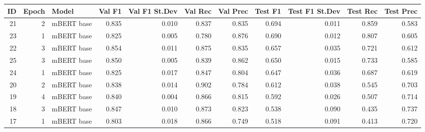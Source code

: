 \begin{tabular}{rrlrrrrrrrr}
\toprule
 ID &  Epoch &      Model &  Val F1 &  Val F1 St.Dev &  Val Rec &  Val Prec &  Test F1 &  Test F1 St.Dev &  Test Rec &  Test Prec \\
\midrule
 21 &      2 & mBERT base &   0.835 &          0.010 &    0.837 &     0.835 &    0.694 &           0.011 &     0.859 &      0.583 \\
 23 &      1 & mBERT base &   0.825 &          0.005 &    0.780 &     0.876 &    0.690 &           0.012 &     0.807 &      0.605 \\
 22 &      3 & mBERT base &   0.854 &          0.011 &    0.875 &     0.835 &    0.657 &           0.035 &     0.721 &      0.612 \\
 25 &      3 & mBERT base &   0.850 &          0.005 &    0.839 &     0.862 &    0.650 &           0.015 &     0.733 &      0.585 \\
 24 &      1 & mBERT base &   0.825 &          0.017 &    0.847 &     0.804 &    0.647 &           0.036 &     0.687 &      0.619 \\
 20 &      2 & mBERT base &   0.838 &          0.014 &    0.902 &     0.784 &    0.612 &           0.038 &     0.545 &      0.703 \\
 19 &      4 & mBERT base &   0.840 &          0.004 &    0.866 &     0.815 &    0.592 &           0.026 &     0.507 &      0.714 \\
 18 &      3 & mBERT base &   0.847 &          0.010 &    0.873 &     0.823 &    0.538 &           0.090 &     0.435 &      0.737 \\
 17 &      1 & mBERT base &   0.803 &          0.018 &    0.866 &     0.749 &    0.518 &           0.091 &     0.413 &      0.720 \\
  \hline
\end{tabular}
